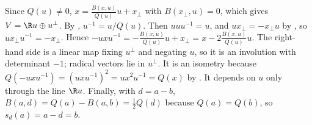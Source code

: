 Since $Q(u) \ne 0$, $x = \frac{B(x,u)}{Q(u)} u + x_{\perp}$ with $B(x_{\perp}, u) = 0$, which gives $V = \R u \oplus u^{\perp}$. By , $u^{-1} = u/Q(u)$. Then $u u u^{-1} = u$, and $u x_{\perp} = -x_{\perp} u$ by , so $u x_{\perp} u^{-1} = -x_{\perp}$. Hence $-u x u^{-1} = -\frac{B(x,u)}{Q(u)}u + x_{\perp} = x - 2\frac{B(x,u)}{Q(u)} u$. The right-hand side is a linear map fixing $u^{\perp}$ and negating $u$, so it is an involution with determinant $-1$; radical vectors lie in $u^{\perp}$. It is an isometry because $Q(-u x u^{-1}) = (u x u^{-1})^{2} = u x^{2} u^{-1} = Q(x)$ by . It depends on $u$ only through the line $\R u$. Finally, with $d = a - b$, $B(a, d) = Q(a) - B(a, b) = \tfrac12 Q(d)$ because $Q(a) = Q(b)$, so $s_d(a) = a - d = b$.
